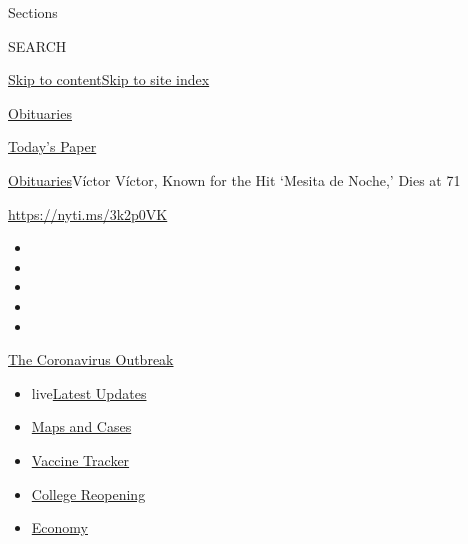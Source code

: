 Sections

SEARCH

\protect\hyperlink{site-content}{Skip to
content}\protect\hyperlink{site-index}{Skip to site index}

\href{https://www.nytimes3xbfgragh.onion/section/obituaries}{Obituaries}

\href{https://myaccount.nytimes3xbfgragh.onion/auth/login?response_type=cookie\&client_id=vi}{}

\href{https://www.nytimes3xbfgragh.onion/section/todayspaper}{Today's
Paper}

\href{/section/obituaries}{Obituaries}\textbar{}Víctor Víctor, Known for
the Hit `Mesita de Noche,' Dies at 71

\url{https://nyti.ms/3k2p0VK}

\begin{itemize}
\item
\item
\item
\item
\item
\end{itemize}

\href{https://www.nytimes3xbfgragh.onion/news-event/coronavirus?action=click\&pgtype=Article\&state=default\&region=TOP_BANNER\&context=storylines_menu}{The
Coronavirus Outbreak}

\begin{itemize}
\tightlist
\item
  live\href{https://www.nytimes3xbfgragh.onion/2020/08/04/world/coronavirus-cases.html?action=click\&pgtype=Article\&state=default\&region=TOP_BANNER\&context=storylines_menu}{Latest
  Updates}
\item
  \href{https://www.nytimes3xbfgragh.onion/interactive/2020/us/coronavirus-us-cases.html?action=click\&pgtype=Article\&state=default\&region=TOP_BANNER\&context=storylines_menu}{Maps
  and Cases}
\item
  \href{https://www.nytimes3xbfgragh.onion/interactive/2020/science/coronavirus-vaccine-tracker.html?action=click\&pgtype=Article\&state=default\&region=TOP_BANNER\&context=storylines_menu}{Vaccine
  Tracker}
\item
  \href{https://www.nytimes3xbfgragh.onion/2020/08/02/us/covid-college-reopening.html?action=click\&pgtype=Article\&state=default\&region=TOP_BANNER\&context=storylines_menu}{College
  Reopening}
\item
  \href{https://www.nytimes3xbfgragh.onion/live/2020/08/04/business/stock-market-today-coronavirus?action=click\&pgtype=Article\&state=default\&region=TOP_BANNER\&context=storylines_menu}{Economy}
\end{itemize}

